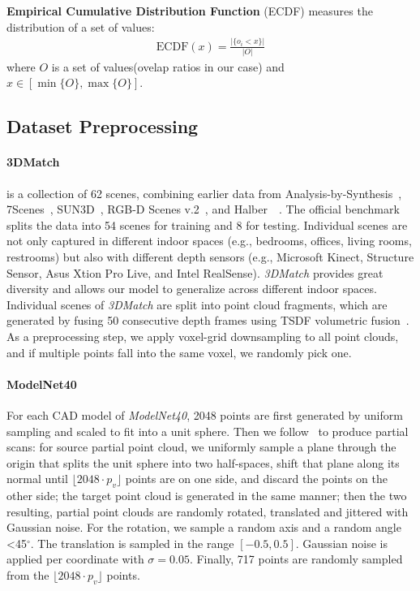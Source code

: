 \textbf{Empirical Cumulative Distribution Function} (ECDF) measures the distribution of a set of values:
\begin{equation}
\begin{aligned}
\text{ECDF} (x) = \frac{\big|\{o_i < x\}\big|}{\big|O\big|}
\end{aligned}
\end{equation}
where $O$ is a set of values(ovelap ratios in our case) and $x \in [\min\{O\}, \max\{O\}]$.

\subsection{Dataset Preprocessing}
\label{sec:datasets_supp}
\paragraph{3DMatch}
\cite{zeng20163dmatch} is a collection of 62 scenes, combining earlier data from Analysis-by-Synthesis~\cite{valentin2016learning}, 7Scenes~\cite{shotton2013scene}, SUN3D~\cite{xiao2013sun3d}, RGB-D Scenes v.2~\cite{lai2014unsupervised}, and Halber~\etal~\cite{Halber2016StructuredGR}.  The official benchmark splits the data into 54 scenes for training and 8 for testing. Individual scenes are not only captured in different indoor spaces (e.g., bedrooms, offices, living rooms, restrooms) but also with different depth sensors (e.g., Microsoft Kinect, Structure Sensor, Asus Xtion Pro Live, and Intel RealSense). \emph{3DMatch} provides great diversity and allows our model to generalize across different indoor spaces. Individual scenes of \emph{3DMatch} are split into point cloud fragments, which are generated by fusing 50 consecutive depth frames using TSDF volumetric fusion~\cite{curless1996volumetric}. As a preprocessing step, we apply voxel-grid downsampling to all point clouds, and if multiple points fall into the same voxel, we randomly pick one.

\paragraph{ModelNet40}
For each CAD model of \emph{ModelNet40}, 2048 points are first generated by uniform sampling and scaled to fit into a unit sphere. Then we follow~\cite{yew2020rpm} to produce partial scans: for source partial point cloud, we uniformly sample a plane through the origin that splits the unit sphere into two half-spaces, shift that plane along its normal until $\lfloor 2048\cdot p_v \rfloor$ points are on one side, and discard the points on the other side; the target point cloud is generated in the same manner; then the two resulting, partial point clouds are randomly rotated, translated and jittered with Gaussian noise. For the rotation, we sample a random axis and a random angle \textless45$^\circ$. The translation is sampled in the range $[-0.5,0.5]$. Gaussian noise is applied per coordinate with $\sigma\!=\!0.05$. Finally, 717 points are randomly sampled from the $\lfloor 2048\cdot p_v \rfloor$ points.



